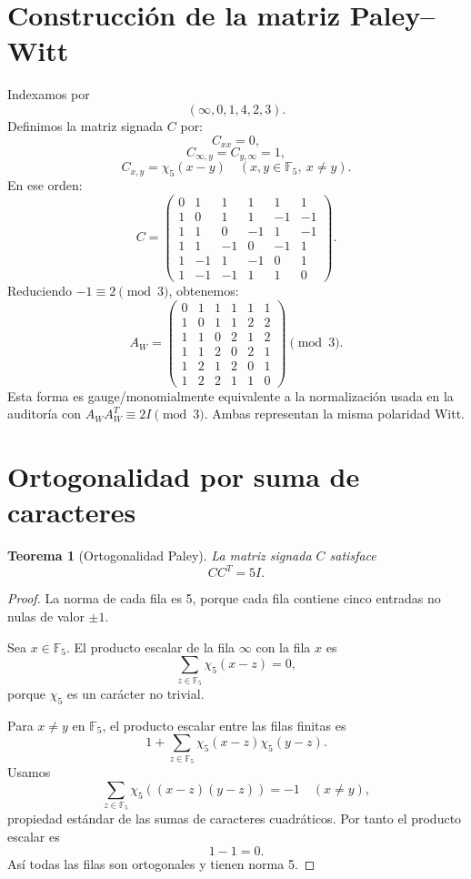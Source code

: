 \documentclass[11pt,a4paper]{article}
\newcommand{\F}{\mathbb F}
\newtheorem{teorema}{Teorema}
\begin{document}
\section{Construcción de la matriz Paley--Witt}
Indexamos por
\[
(\infty,0,1,4,2,3).
\]
Definimos la matriz signada \(C\) por:
\[
C_{xx}=0,
\]
\[
C_{\infty,y}=C_{y,\infty}=1,
\]
\[
C_{x,y}=\chi_5(x-y)\quad(x,y\in\F_5,
\ x\ne y).
\]
En ese orden:
\[
C=
\begin{pmatrix}
0&1&1&1&1&1\\
1&0&1&1&-1&-1\\
1&1&0&-1&1&-1\\
1&1&-1&0&-1&1\\
1&-1&1&-1&0&1\\
1&-1&-1&1&1&0
\end{pmatrix}.
\]
Reduciendo \(-1\equiv2\pmod3\), obtenemos:
\[
A_W=
\begin{pmatrix}
0&1&1&1&1&1\\
1&0&1&1&2&2\\
1&1&0&2&1&2\\
1&1&2&0&2&1\\
1&2&1&2&0&1\\
1&2&2&1&1&0
\end{pmatrix}\pmod3.
\]
Esta forma es gauge/monomialmente equivalente a la normalización usada en la auditoría con \(A_WA_W^T\equiv2I\pmod3\). Ambas representan la misma polaridad Witt.

\section{Ortogonalidad por suma de caracteres}
\begin{teorema}[Ortogonalidad Paley]
La matriz signada \(C\) satisface
\[
\boxed{C C^T=5I.}
\]
\end{teorema}

\begin{proof}
La norma de cada fila es 5, porque cada fila contiene cinco entradas no nulas de valor \(\pm1\).

Sea \(x\in\F_5\). El producto escalar de la fila \(\infty\) con la fila \(x\) es
\[
\sum_{z\in\F_5}\chi_5(x-z)=0,
\]
porque \(\chi_5\) es un carácter no trivial.

Para \(x\ne y\) en \(\F_5\), el producto escalar entre las filas finitas es
\[
1+
\sum_{z\in\F_5}\chi_5(x-z)\chi_5(y-z).
\]
Usamos
\[
\sum_{z\in\F_5}\chi_5((x-z)(y-z))=-1
\quad(x\ne y),
\]
propiedad estándar de las sumas de caracteres cuadráticos. Por tanto el producto escalar es
\[
1-1=0.
\]
Así todas las filas son ortogonales y tienen norma 5.
\end{proof}
\end{document}
